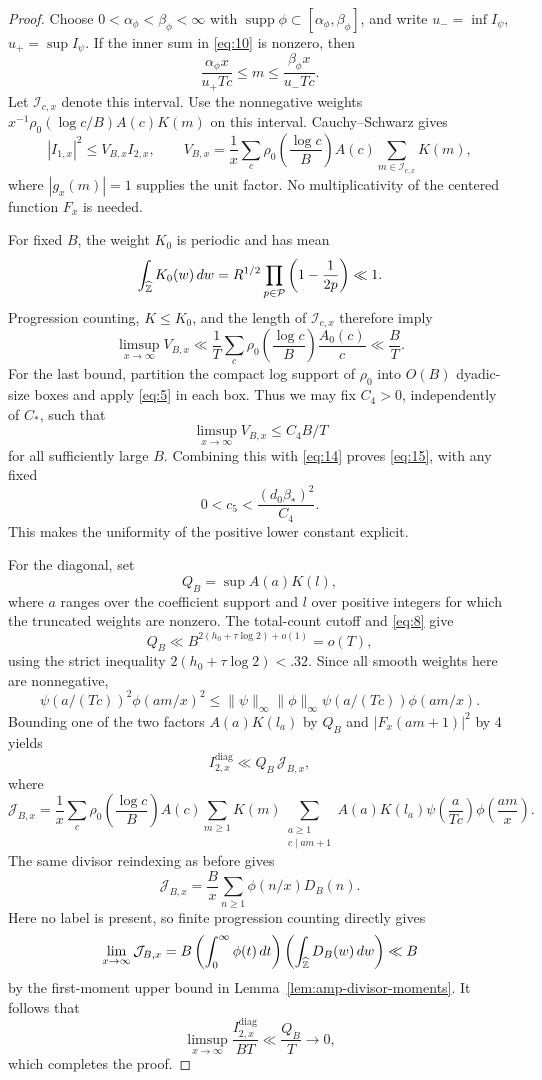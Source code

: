 \begin{proof}
Choose $0<\alpha_\phi<\beta_\phi<\infty$ with
$\operatorname{supp}\phi\subset[\alpha_\phi,\beta_\phi]$,
and write $u_- =\inf I_\psi$, $u_+=\sup I_\psi$.
If the inner sum in \eqref{eq:10} is nonzero, then
\[
 \frac{\alpha_\phi x}{u_+Tc}
 \le m\le
 \frac{\beta_\phi x}{u_-Tc}.
\]
Let $\mathcal I_{c,x}$ denote this interval. Use the nonnegative weights
$x^{-1}\rho_0(\log c/B)A(c)K(m)$ on this interval.
Cauchy--Schwarz gives
\[
 |I_{1,x}|^2
 \le V_{B,x} I_{2,x},
 \qquad
 V_{B,x}=
 \frac1x\sum_c\rho_0\left(\frac{\log c}{B}\right)A(c)
       \sum_{m\in\mathcal I_{c,x}}K(m),
\]
where $|g_x(m)|=1$ supplies the unit factor.  No multiplicativity of
the centered function $F_x$ is needed.

For fixed $B$, the weight $K_0$ is periodic and has mean
\[
 \int_{\widehat{\mathbb Z}}K_0(w)\,dw
 =R^{1/2}\prod_{p\in\mathcal P}\left(1-\frac1{2p}\right)
 \ll1.
\]
Progression counting, $K\le K_0$, and the length of
$\mathcal I_{c,x}$ therefore imply
\[
 \limsup_{x\to\infty}V_{B,x}
 \ll\frac1T\sum_c
       \rho_0\left(\frac{\log c}{B}\right)\frac{A_0(c)}c
 \ll\frac BT.
\]
For the last bound, partition the compact log support of
$\rho_0$ into $O(B)$ dyadic-size boxes and apply
\eqref{eq:5} in each box.  Thus we may fix $C_4>0$,
independently of $C_*$, such that
\[
 \limsup_{x\to\infty}V_{B,x}\le C_4B/T
\]
for all sufficiently large $B$.  Combining this with
\eqref{eq:14} proves \eqref{eq:15}, with any fixed
\[
 0<c_5<\frac{(d_0\beta_*)^2}{C_4}.
\]
This makes the uniformity of the positive lower constant
explicit.

For the diagonal, set
\[
 Q_B=\sup A(a)K(l),
\]
where $a$ ranges over the coefficient support and $l$ over
positive integers for which the truncated weights are
nonzero.  The total-count cutoff and \eqref{eq:8} give
\[
 Q_B\ll B^{2(h_0+\tau\log2)+o(1)}=o(T),
\]
using the strict inequality
$2(h_0+\tau\log2)<.32$.  Since all smooth weights here are
nonnegative,
\[
 \psi(a/(Tc))^2\phi(am/x)^2
 \le \|\psi\|_\infty\|\phi\|_\infty
       \psi(a/(Tc))\phi(am/x).
\]
Bounding one of the two factors $A(a)K(l_a)$ by $Q_B$ and
$|F_x(am+1)|^2$ by 4 yields
\[
 I_{2,x}^{\mathrm{diag}}
 \ll Q_B\,\mathcal J_{B,x},
\]
where
\[
 \mathcal J_{B,x}=
 \frac1x\sum_c\rho_0\left(\frac{\log c}{B}\right)A(c)
 \sum_{m\ge1}K(m)
 \sum_{\substack{a\ge1\\c\mid am+1}}
 A(a)K(l_a)\psi\left(\frac{a}{Tc}\right)
 \phi\left(\frac{am}{x}\right).
\]
The same divisor reindexing as before gives
\[
 \mathcal J_{B,x}
 =\frac Bx\sum_{n\ge1}\phi(n/x)D_B(n).
\]
Here no label is present, so finite progression counting
directly gives
\[
 \lim_{x\to\infty}\mathcal J_{B,x}
 =B\left(\int_0^\infty\phi(t)\,dt\right)
       \left(\int_{\widehat{\mathbb Z}}D_B(w)\,dw\right)
 \ll B
\]
by the first-moment upper bound in
Lemma~\ref{lem:amp-divisor-moments}.  It follows that
\[
 \limsup_{x\to\infty}\frac{I_{2,x}^{\mathrm{diag}}}{BT}
 \ll\frac{Q_B}{T}\longrightarrow0,
\]
which completes the proof.
\end{proof}
